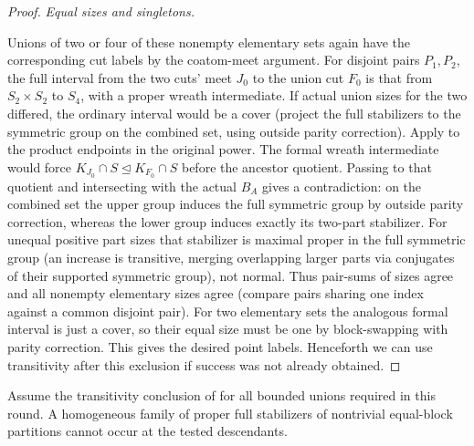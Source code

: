 \begin{proof}
\smallskip\noindent\emph{Equal sizes and singletons.}

Unions of two or four of these nonempty elementary sets again have the corresponding cut labels by the
coatom-meet argument. For disjoint pairs \(P_1,P_2\), the full interval from the two cuts' meet \(J_0\)
to the union cut \(F_0\) is that from \(S_2\times S_2\) to \(S_4\), with a proper wreath intermediate. If
actual union sizes for the two differed, the ordinary interval would be a cover (project the full
stabilizers to the symmetric group on the combined set, using outside parity correction).
Apply  to the product endpoints in the original
power.  The formal wreath intermediate would force
\(K_{J_0}\cap S\trianglelefteq K_{F_0}\cap S\) before the ancestor
quotient.  Passing to that quotient and intersecting with the actual
\(B_A\) gives a contradiction: on the combined set the upper group
induces the full symmetric group by outside parity correction, whereas
the lower group induces exactly its two-part stabilizer.  For
unequal positive part sizes that stabilizer is maximal proper in the full symmetric group (an increase is
transitive, merging overlapping larger parts via conjugates of their supported symmetric group), not
normal. Thus pair-sums of sizes agree and all nonempty elementary sizes agree (compare pairs sharing one
index against a common disjoint pair). For two elementary sets the analogous formal interval is just a
cover, so their equal size must be one by block-swapping with parity correction. This gives the desired
point labels. Henceforth we can use transitivity after this exclusion if success was not already
obtained.

\end{proof}

\begin{lemma}\label{fa:imprimitive-exclusion}
Assume the transitivity conclusion of  for all bounded unions required in this
round.  A homogeneous family of proper full stabilizers of nontrivial equal-block partitions cannot occur
at the tested descendants.
\end{lemma}

